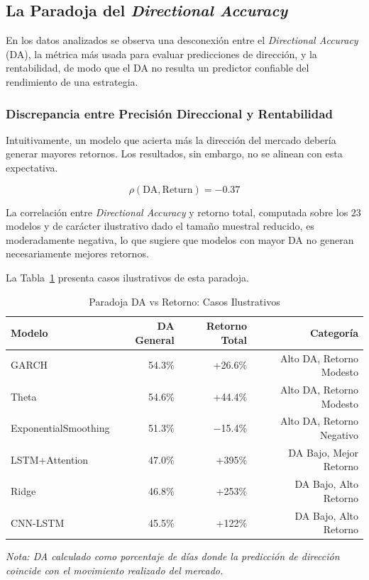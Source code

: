
\subsection{La Paradoja del \textit{Directional Accuracy}}
\label{sec:da_paradox}

En los datos analizados se observa una desconexi\'on entre el \textit{Directional Accuracy} (DA), la m\'etrica m\'as usada para evaluar predicciones de direcci\'on, y la rentabilidad, de modo que el DA no resulta un predictor confiable del rendimiento de una estrategia.

\subsubsection{Discrepancia entre Precisi\'on Direccional y Rentabilidad}
\label{subsec:counterintuitive}

Intuitivamente, un modelo que acierta m\'as la direcci\'on del mercado deber\'ia generar mayores retornos. Los resultados, sin embargo, no se alinean con esta expectativa.

\begin{equation}
\rho(\text{DA}, \text{Return}) = -0.37
\end{equation}

La correlaci\'on entre \textit{Directional Accuracy} y retorno total, computada sobre los 23 modelos y de car\'acter ilustrativo dado el tama\~no muestral reducido, es moderadamente negativa, lo que sugiere que modelos con mayor DA no generan necesariamente mejores retornos.

La Tabla~\ref{tab:da_paradox} presenta casos ilustrativos de esta paradoja.

\begin{table}[htbp]
\centering
\caption{Paradoja DA vs Retorno: Casos Ilustrativos}
\label{tab:da_paradox}
\begin{tabular}{@{}lrrr@{}}
\toprule
\textbf{Modelo} & \textbf{DA General} & \textbf{Retorno Total} & \textbf{Categor\'ia} \\
\midrule
GARCH & 54.3\% & +26.6\% & Alto DA, Retorno Modesto \\
Theta & 54.6\% & +44.4\% & Alto DA, Retorno Modesto \\
ExponentialSmoothing & 51.3\% & $-$15.4\% & Alto DA, Retorno Negativo \\
\midrule
LSTM+Attention & 47.0\% & +395\% & DA Bajo, Mejor Retorno \\
Ridge & 46.8\% & +253\% & DA Bajo, Alto Retorno \\
CNN-LSTM & 45.5\% & +122\% & DA Bajo, Alto Retorno \\
\bottomrule
\end{tabular}

\vspace{0.2cm}
\parbox{0.9\textwidth}{\footnotesize\textit{Nota: DA calculado como porcentaje de d\'ias donde la predicci\'on de direcci\'on coincide con el movimiento realizado del mercado.}}
\end{table}

